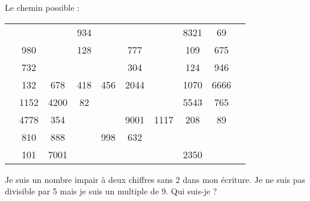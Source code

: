 \begin{colonne*exercice}
\begin{corrige}
   Le chemin possible : \\ [1mm]
   {\footnotesize
   \hspace*{-10mm}
      {
      \begin{tabular}{C{0.2}|*{8}{C{0.43}|}C{0.3}}
          &  &  & 934 &  &  &  & 8321 & 69 & \\
         & 980 &  & 128 &  & 777 &  & 109 & 675 & \\
         & 732 &  &  &  & 304 &  & 124 & 946 & \\
         & 132 & 678 & 418 & 456 & 2044 &  & 1070 & 6666 & \\
         & 1152 & 4200 & 82 &  &  &  & 5543 & 765 & \\
         & 4778 & 354 &  &  & 9001 & 1117 & 208 & 89 & \\
         & 810 & 888 &  & 998 & 632 &  &  &  & \\
         & 101 & 7001 &  &  &  &  & 2350 &  &  \\
      \end{tabular}}}
\end{corrige}

\bigskip


\begin{exercice} %
   Je suis un nombre impair à deux chiffres sans 2 dans mon écriture. Je ne suis pas divisible par 5 mais je suis un multiple de 9. Qui suis-je ? 
\end{exercice}


\end{colonne*exercice}

